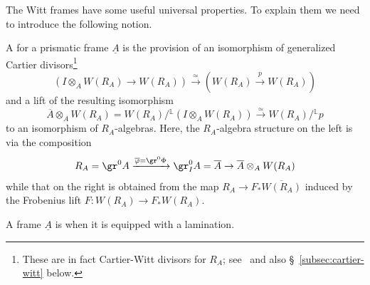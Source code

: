 \documentclass[10pt]{amsart}
\begin{document}
The Witt frames have some useful universal properties. To explain them we need to introduce the following notion.

\begin{definition}[Laminations]
\label{defn:laminated}
A  for a prismatic frame $\underline{A}$ is the provision of an isomorphism of generalized Cartier divisors\footnote{These are in fact Cartier-Witt divisors for $R_A$; see~\cite[Example 2.11]{bhatt2022prismatization} and also \S~\ref{subsec:cartier-witt} below.}
\[
 (I\otimes_AW(R_A)\to W(R_A))\xrightarrow{\simeq}(W(R_A)\xrightarrow{p}W(R_A))
\]
and a lift of the resulting isomorphism 
\[
\overline{A}\otimes_AW(R_A)=W(R_A)/{}^{\mathbb{L}}(I\otimes_AW(R_A))\xrightarrow{\simeq}W(R_A)/{}^{\mathbb{L}}p 
\]
to an isomorphism of $R_A$-algebras. Here, the $R_A$-algebra structure on the left is via the composition
\[
   R_A=\gr^0A \xrightarrow{\overline{\varphi} = \gr^0\Phi}\gr^0_IA = \overline{A}\to \overline{A}\otimes_AW(R_A)
\]
while that on the right is obtained from the map $R_A\to F_*\overline{W(R_A)}$ induced by the Frobenius lift $F:W(R_A)\to F_*W(R_A)$. 

A frame $\underline{A}$ is  when it is equipped with a lamination.
\end{definition}
\end{document}
